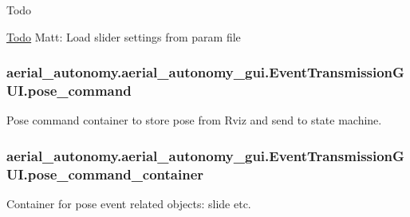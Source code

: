 \begin{DoxyRefDesc}{Todo}
\item[\hyperlink{todo__todo000001}{Todo}]Matt\-: Load slider settings from param file \end{DoxyRefDesc}
\hypertarget{classaerial__autonomy_1_1aerial__autonomy__gui_1_1EventTransmissionGUI_acedbac17d93e4e743b8bef847720659f}{
\subsubsection[{pose\-\_\-command}]{\setlength{\rightskip}{0pt plus 5cm}aerial\-\_\-autonomy.\-aerial\-\_\-autonomy\-\_\-gui.\-Event\-Transmission\-G\-U\-I.\-pose\-\_\-command}}\label{classaerial__autonomy_1_1aerial__autonomy__gui_1_1EventTransmissionGUI_acedbac17d93e4e743b8bef847720659f}


Pose command container to store pose from Rviz and send to state machine. 

\hypertarget{classaerial__autonomy_1_1aerial__autonomy__gui_1_1EventTransmissionGUI_af611df98da28aba90ce5fcbea285603a}{
\subsubsection[{pose\-\_\-command\-\_\-container}]{\setlength{\rightskip}{0pt plus 5cm}aerial\-\_\-autonomy.\-aerial\-\_\-autonomy\-\_\-gui.\-Event\-Transmission\-G\-U\-I.\-pose\-\_\-command\-\_\-container}}\label{classaerial__autonomy_1_1aerial__autonomy__gui_1_1EventTransmissionGUI_af611df98da28aba90ce5fcbea285603a}


Container for pose event related objects\-: slide etc. 

